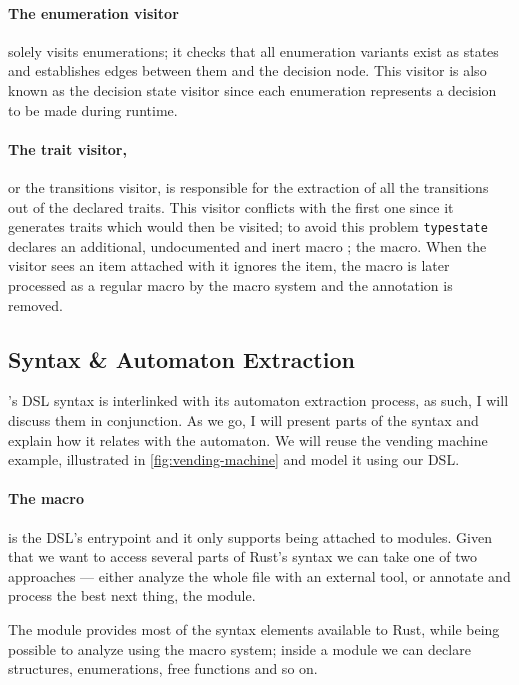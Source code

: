 \paragraph{The enumeration visitor} solely visits enumerations;
it checks that all enumeration variants exist as states and establishes edges between them and the decision node.
This visitor is also known as the decision state visitor since each enumeration represents a decision to be made during runtime.

\paragraph{The trait visitor,} or the transitions visitor,
is responsible for the extraction of all the transitions out of the declared traits.
This visitor conflicts with the first one since it generates traits which would then be visited;
to avoid this problem \texttt{typestate} declares an additional, undocumented and inert macro ;
the  macro.
When the visitor sees an item attached with  it ignores the item,
the  macro is later processed as a regular macro by the macro system and the annotation is removed.

\subsection{Syntax \& Automaton Extraction}\label{sec:macro-dsl:syntax}

's DSL syntax is interlinked with its automaton extraction process,
as such, I will discuss them in conjunction.
As we go, I will present parts of the syntax and explain how it relates with the automaton.
We will reuse the vending machine example, illustrated in \autoref{fig:vending-machine} and model it using our DSL.

\paragraph{The  macro} is the DSL's entrypoint and it only supports being attached to modules.
Given that we want to access several parts of Rust's syntax  we can take one of two approaches ---
either analyze the whole file with an external tool, or annotate and process the best next thing, the module.

The module provides most of the syntax elements available to  Rust,
while being possible to analyze using the macro system;
inside a module we can declare structures, enumerations, free functions and so on.

